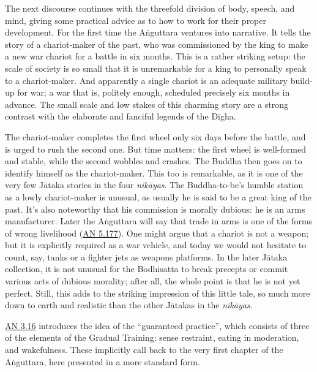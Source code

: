 \documentclass[12pt,openany]{book}%
\begin{document}
The next discourse continues with the threefold division of body, speech, and mind, giving some practical advice as to how to work for their proper development. For the first time the \textsanskrit{Aṅguttara} ventures into narrative. It tells the story of a chariot-maker of the past, who was commissioned by the king to make a new war chariot for a battle in six months. This is a rather striking setup: the scale of society is so small that it is unremarkable for a king to personally speak to a chariot-maker. And apparently a single chariot is an adequate military build-up for war; a war that is, politely enough, scheduled precisely six months in advance. The small scale and low stakes of this charming story are a strong contrast with the elaborate and fanciful legends of the \textsanskrit{Dīgha}.

The chariot-maker completes the first wheel only six days before the battle, and is urged to rush the second one. But time matters: the first wheel is well-formed and stable, while the second wobbles and crashes. The Buddha then goes on to identify himself as the chariot-maker. This too is remarkable, as it is one of the very few \textsanskrit{Jātaka} stories in the four \textit{\textsanskrit{nikāyas}}. The Buddha-to-be’s humble station as a lowly chariot-maker is unusual, as usually he is said to be a great king of the past. It’s also noteworthy that his commission is morally dubious: he is an arms manufacturer. Later the \textsanskrit{Aṅguttara} will say that trade in arms is one of the forms of wrong livelihood (\href{https://suttacentral.net/an5.177}{AN 5.177}). One might argue that a chariot is not a weapon; but it is explicitly required as a war vehicle, and today we would not hesitate to count, say, tanks or a fighter jets as weapons platforms. In the later \textsanskrit{Jātaka} collection, it is not unusual for the Bodhisatta to break precepts or commit various acts of dubious morality; after all, the whole point is that he is not yet perfect. Still, this adds to the striking impression of this little tale, so much more down to earth and realistic than the other \textsanskrit{Jātakas} in the \textit{\textsanskrit{nikāyas}}.

\href{https://suttacentral.net/an3.16}{AN 3.16} introduces the idea of the “guaranteed practice”, which consists of three of the elements of the Gradual Training: sense restraint, eating in moderation, and wakefulness. These implicitly call back to the very first chapter of the \textsanskrit{Aṅguttara}, here presented in a more standard form.
\end{document}
